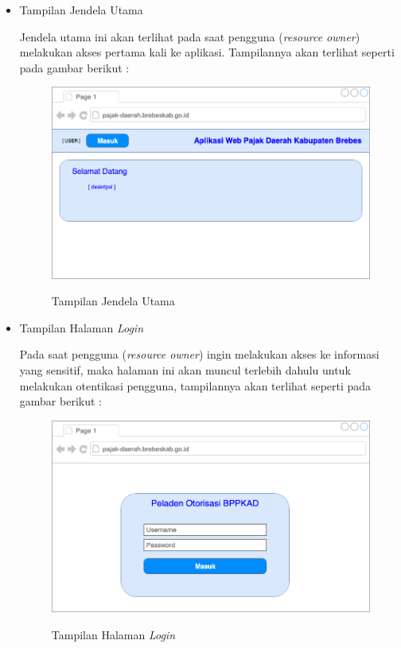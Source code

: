 \documentclass[pdftex,12pt, oneside]{article}
\begin{document}
\begin{itemize}
	\item Tampilan Jendela Utama
	
	Jendela utama ini akan terlihat pada saat pengguna (\textit{resource owner}) melakukan akses pertama kali ke aplikasi. Tampilannya akan terlihat seperti pada gambar berikut :
	
	\begin{figure}[H]
		\centering
		\includegraphics[width=1\textwidth]{./resources/main-ui}
		\label{fig:main-ui}
		\caption{Tampilan Jendela Utama}
	\end{figure}
	
	\item Tampilan Halaman \textit{Login}
	
	Pada saat pengguna (\textit{resource owner}) ingin melakukan akses ke informasi yang sensitif, maka halaman ini akan muncul terlebih dahulu untuk melakukan otentikasi pengguna, tampilannya akan terlihat seperti pada gambar berikut :
	
	\begin{figure}[H]
		\centering
		\includegraphics[width=1\textwidth]{./resources/login-ui}
		\label{fig:login-ui}
		\caption{Tampilan Halaman \textit{Login}}
	\end{figure}
	

\end{itemize}
\end{document}
